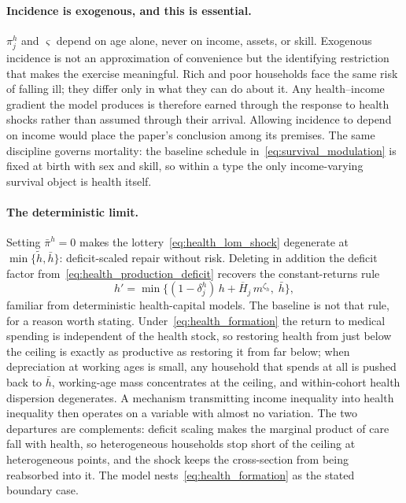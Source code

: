 \documentclass[12pt,a4paper]{article}
\begin{document}
\paragraph{Incidence is exogenous, and this is essential.}
$\pi^h_j$ and $\varsigma$ depend on age alone, never on income, assets, or skill. Exogenous incidence is not an approximation of convenience but the identifying restriction that makes the exercise meaningful. Rich and poor households face the same risk of falling ill; they differ only in what they can do about it. Any health--income gradient the model produces is therefore earned through the response to health shocks rather than assumed through their arrival. Allowing incidence to depend on income would place the paper's conclusion among its premises. The same discipline governs mortality: the baseline schedule in~\eqref{eq:survival_modulation} is fixed at birth with sex and skill, so within a type the only income-varying survival object is health itself.

\paragraph{The deterministic limit.}
Setting $\bar\pi^h = 0$ makes the lottery~\eqref{eq:health_lom_shock} degenerate at $\min\{\tilde h, \bar h\}$: deficit-scaled repair without risk. Deleting in addition the deficit factor from~\eqref{eq:health_production_deficit} recovers the constant-returns rule
\begin{equation}
\label{eq:health_formation}
h' = \min\bigl\{(1 - \delta_j^h)\, h + \overline{H}_j\, m^{\zeta_h},\; \bar h\bigr\},
\end{equation}
familiar from deterministic health-capital models. The baseline is not that rule, for a reason worth stating. Under~\eqref{eq:health_formation} the return to medical spending is independent of the health stock, so restoring health from just below the ceiling is exactly as productive as restoring it from far below; when depreciation at working ages is small, any household that spends at all is pushed back to $\bar h$, working-age mass concentrates at the ceiling, and within-cohort health dispersion degenerates. A mechanism transmitting income inequality into health inequality then operates on a variable with almost no variation. The two departures are complements: deficit scaling makes the marginal product of care fall with health, so heterogeneous households stop short of the ceiling at heterogeneous points, and the shock keeps the cross-section from being reabsorbed into it. The model nests~\eqref{eq:health_formation} as the stated boundary case.
\end{document}
